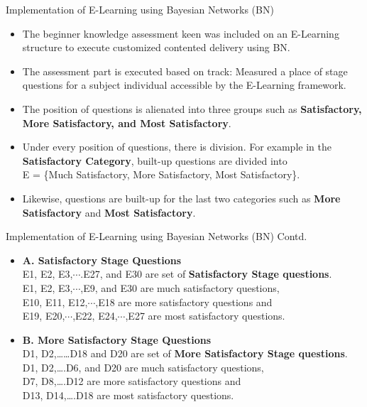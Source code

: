 \documentclass{beamer}
\begin{document}
\begin{frame}
\begin{block}{Implementation of E-Learning using Bayesian Networks (BN)}
\begin{itemize}
  \item The beginner knowledge assessment keen was included on an E-Learning structure to execute customized contented delivery using BN.
  \item The assessment part is executed based on track: Measured a place of stage questions for a subject individual accessible by the E-Learning framework.
  \item The position of questions is alienated into three groups such as \textbf{Satisfactory, More Satisfactory, and Most Satisfactory}.
  \item Under every position of questions, there is division. For example in the \textbf{Satisfactory Category}, built-up questions are divided into \\ 
  E = \{Much Satisfactory, More Satisfactory, Most Satisfactory\}.
  \item Likewise, questions are built-up for the last two categories such as \textbf{More Satisfactory} and \textbf{Most Satisfactory}.

\end{itemize}
\end{block}
\end{frame}

    
\begin{frame}
\begin{block}{Implementation of E-Learning using Bayesian Networks (BN) Contd.}
\begin{itemize}
    \item \textbf{A. Satisfactory Stage Questions} \\
        E1, E2, E3,$\cdots$.E27, and E30 are set of \textbf{Satisfactory Stage questions}. \\
        E1, E2, E3,$\cdots$,E9, and E30 are much satisfactory questions, \\ E10, E11, E12,$\cdots$,E18 are more satisfactory questions and \\ 
        E19, E20,$\cdots$,E22, E24,$\cdots$,E27 are most satisfactory questions.
    \item \textbf{B. More Satisfactory Stage Questions} \\
        D1, D2,……D18 and D20 are set of \textbf{More Satisfactory Stage questions}. \\
        D1, D2,….D6, and D20 are much satisfactory questions, \\
        D7, D8,….D12 are more satisfactory questions and \\ 
        D13, D14,….D18 are most satisfactory questions.
            
\end{itemize}
\end{block}
\end{frame}
\end{document}
